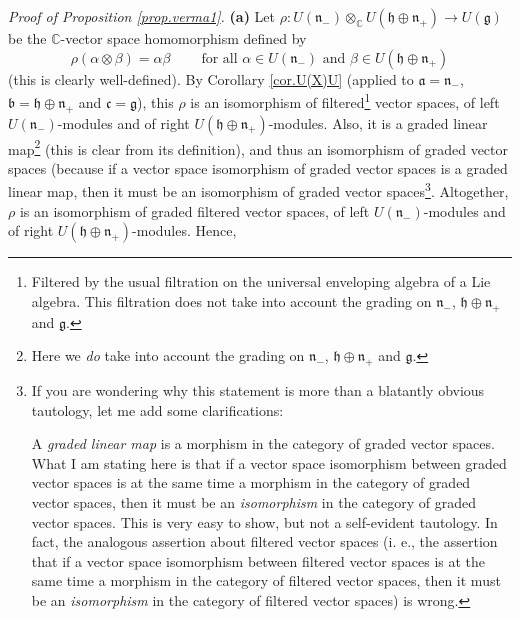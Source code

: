 \documentclass
[numbers=enddot,12pt,final,onecolumn,german,notitlepage]{scrartcl}%
\theoremstyle{definition}
\begin{document}
\textit{Proof of Proposition \ref{prop.verma1}.} \textbf{(a)} Let
$\rho:U\left(  \mathfrak{n}_{-}\right)  \otimes_{\mathbb{C}}U\left(
\mathfrak{h}\oplus\mathfrak{n}_{+}\right)  \rightarrow U\left(  \mathfrak{g}%
\right)  $ be the $\mathbb{C}$-vector space homomorphism defined by%
\[
\rho\left(  \alpha\otimes\beta\right)  =\alpha\beta
\ \ \ \ \ \ \ \ \ \ \text{for all }\alpha\in U\left(  \mathfrak{n}_{-}\right)
\text{ and }\beta\in U\left(  \mathfrak{h}\oplus\mathfrak{n}_{+}\right)
\]
(this is clearly well-defined). By Corollary \ref{cor.U(X)U} (applied to
$\mathfrak{a}=\mathfrak{n}_{-}$, $\mathfrak{b}=\mathfrak{h}\oplus
\mathfrak{n}_{+}$ and $\mathfrak{c}=\mathfrak{g}$), this $\rho$ is an
isomorphism of filtered\footnote{Filtered by the usual filtration on the
universal enveloping algebra of a Lie algebra. This filtration does not take
into account the grading on $\mathfrak{n}_{-}$, $\mathfrak{h}\oplus
\mathfrak{n}_{+}$ and $\mathfrak{g}$.} vector spaces, of left $U\left(
\mathfrak{n}_{-}\right)  $-modules and of right $U\left(  \mathfrak{h}%
\oplus\mathfrak{n}_{+}\right)  $-modules. Also, it is a graded linear
map\footnote{Here we \textit{do} take into account the grading on
$\mathfrak{n}_{-}$, $\mathfrak{h}\oplus\mathfrak{n}_{+}$ and $\mathfrak{g}$.}
(this is clear from its definition), and thus an isomorphism of graded vector
spaces (because if a vector space isomorphism of graded vector spaces is a
graded linear map, then it must be an isomorphism of graded vector
spaces\footnote{If you are wondering why this statement is more than a
blatantly obvious tautology, let me add some clarifications:
\par
A \textit{graded linear map} is a morphism in the category of graded vector
spaces. What I am stating here is that if a vector space isomorphism between
graded vector spaces is at the same time a morphism in the category of graded
vector spaces, then it must be an \textit{isomorphism} in the category of
graded vector spaces. This is very easy to show, but not a self-evident
tautology. In fact, the analogous assertion about filtered vector spaces (i.
e., the assertion that if a vector space isomorphism between filtered vector
spaces is at the same time a morphism in the category of filtered vector
spaces, then it must be an \textit{isomorphism} in the category of filtered
vector spaces) is wrong.}. Altogether, $\rho$ is an isomorphism of graded
filtered vector spaces, of left $U\left(  \mathfrak{n}_{-}\right)  $-modules
and of right $U\left(  \mathfrak{h}\oplus\mathfrak{n}_{+}\right)  $-modules.
Hence,%
\end{document}
